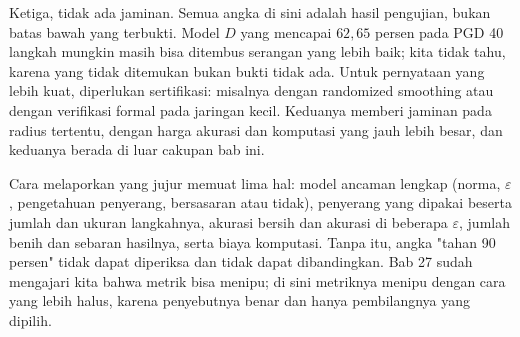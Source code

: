 Ketiga, tidak ada jaminan. Semua angka di sini adalah hasil pengujian, bukan batas
bawah yang terbukti. Model $D$ yang mencapai $62{,}65$ persen pada PGD 40 langkah
mungkin masih bisa ditembus serangan yang lebih baik; kita tidak tahu, karena yang
tidak ditemukan bukan bukti tidak ada. Untuk pernyataan yang lebih kuat, diperlukan
sertifikasi: misalnya dengan randomized smoothing atau dengan verifikasi formal pada
jaringan kecil. Keduanya memberi jaminan pada radius tertentu, dengan harga akurasi
dan komputasi yang jauh lebih besar, dan keduanya berada di luar cakupan bab ini.

Cara melaporkan yang jujur memuat lima hal: model ancaman lengkap (norma,
$\varepsilon$, pengetahuan penyerang, bersasaran atau tidak), penyerang yang dipakai
beserta jumlah dan ukuran langkahnya, akurasi bersih dan akurasi di beberapa
$\varepsilon$, jumlah benih dan sebaran hasilnya, serta biaya komputasi. Tanpa itu,
angka "tahan 90 persen" tidak dapat diperiksa dan tidak dapat dibandingkan.
Bab 27 sudah mengajari kita bahwa metrik bisa menipu; di sini metriknya menipu dengan
cara yang lebih halus, karena penyebutnya benar dan hanya pembilangnya yang dipilih.

